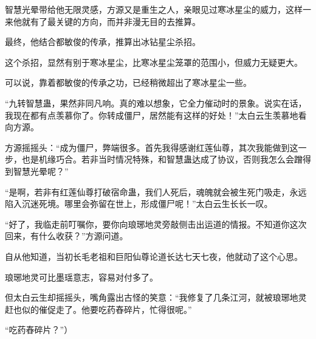 \begin{this_body}
智慧光晕带给他无限灵感，方源又是重生之人，亲眼见过寒冰星尘的威力，这样一来他就有了最关键的方向，而并非漫无目的去推算。

最终，他结合都敏俊的传承，推算出冰钻星尘杀招。

这个杀招，显然有别于寒冰星尘，比寒冰星尘笼罩的范围小，但威力无疑更大。

可以说，靠着都敏俊的传承之功，已经稍微超出了寒冰星尘一些。

“九转智慧蛊，果然非同凡响。真的难以想象，它全力催动时的景象。说实在话，我现在都有点羡慕你了。你转成僵尸，居然能有这样的好处！”太白云生羡慕地看向方源。

方源摇摇头：“成为僵尸，弊端很多。首先我得感谢红莲仙尊，其次我能做到这一步，也是机缘巧合。若非当时情况特殊，和智慧蛊达成了协议，否则我怎么会蹭得到智慧光晕呢？”

“是啊，若非有红莲仙尊打破宿命蛊，我们人死后，魂魄就会被生死门吸走，永远陷入沉迷死境。哪里会弥留在世上，形成僵尸呢！”太白云生长长一叹。

“好了，我临走前叮嘱你，要你向琅琊地灵旁敲侧击出运道的情报。不知道你这次回来，有什么收获？”方源问道。

自从他知道，当初长毛老祖和巨阳仙尊论道长达七天七夜，他就动了这个心思。

琅琊地灵可比墨瑶意志，容易对付多了。

但太白云生却摇摇头，嘴角露出古怪的笑意：“我修复了几条江河，就被琅琊地灵赶也似的催促走了。他要吃药舂碎片，忙得很呢。”

“吃药舂碎片？”）

\end{this_body}

